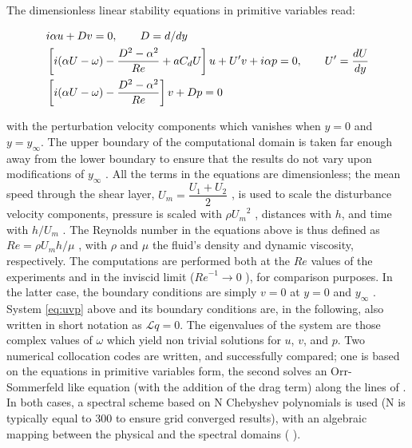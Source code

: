 \newpage
\noindent The dimensionless linear stability equations in primitive variables read:

\begin{equation}
\begin{split}
& i\alpha u + D v =0,  \qquad D=d/dy \vspace{0.3cm}\\
& \left [ i (\alpha U -\omega)   - \frac{D^2-\alpha^2}{Re}+ a C_d U \right] u + U' v + i \alpha p  = 0,  \qquad U'=\dfrac{d U}{dy} \vspace{0.3cm} \\
& \left[ i (\alpha U -\omega)   - \frac{D^2-\alpha^2}{Re} \right ] v + D p   = 0
\label{eq:uvp}
\end{split}
\end{equation}

with the perturbation velocity components which vanishes when $y=0$ and $y=y_{\infty}$. The upper boundary
of the computational domain is taken far enough away from the lower boundary to ensure that the
results do not vary upon modifications of $y_{\infty}$ . All the terms in the equations are dimensionless; the
mean speed through the shear layer, $U_m = \dfrac{U_1 +U_2}{2}$ , is used to scale the disturbance velocity components, pressure is scaled with
$\rho {U_m}^2$ , distances with $h$, and time with $h/U_m$ . The Reynolds number
in the equations above is thus defined as $Re = \rho U_m h/ \mu$ , with $\rho$ and $\mu$ the fluid’s density and dynamic
viscosity, respectively. The computations are performed both at the $Re$ values of the experiments
and in the inviscid limit (${Re}^{-1}  \rightarrow 0$ ), for comparison purposes. In the latter case, the boundary
conditions are simply $v = 0$ at $y = 0$ and $y_{\infty}$ .
System \eqref{eq:uvp} above and its boundary conditions are, in the following, also written in short
notation as $\mathscr{L} q = 0$. The eigenvalues of the system are those complex values of $\omega$ which yield
non trivial solutions for $u$, $v$, and $p$. Two numerical collocation codes are written, and successfully compared; one is based on the equations in primitive variables form, the second solves an
Orr-Sommerfeld like equation (with the addition of the drag term) along the lines of \citet{singh2016linear}.
In both cases, a spectral scheme based on N Chebyshev polynomials is used (N is typically equal
to 300 to ensure grid converged results), with an algebraic mapping between the physical and the
spectral domains (\citet{hussaini1987spectral} ).

